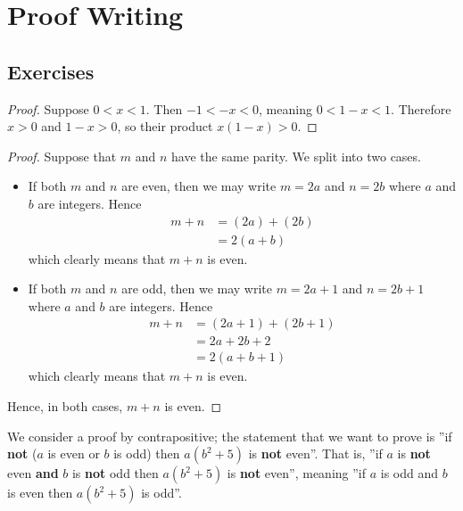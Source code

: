 \section{Proof Writing}
\subsection*{Exercises}
\begin{questions}
    \item \begin{proof}
        Suppose $0 < x < 1$. Then $-1 < -x < 0$, meaning $0 < 1 - x < 1$. Therefore $x > 0$ and $1-x > 0$, so their product $x(1-x) > 0$.
    \end{proof}

    \item \begin{proof}
        Suppose that $m$ and $n$ have the same parity. We split into two cases.
        \begin{itemize}
            \item If both $m$ and $n$ are even, then we may write $m = 2a$ and $n = 2b$ where $a$ and $b$ are integers. Hence
            \begin{align*}
                m + n &= (2a) + (2b) \\
                &= 2(a+b)
            \end{align*}
            which clearly means that $m + n$ is even.
            \item If both $m$ and $n$ are odd, then we may write $m = 2a + 1$ and $n = 2b + 1$ where $a$ and $b$ are integers. Hence
            \begin{align*}
                m + n &= (2a + 1) + (2b + 1)\\
                &= 2a + 2b + 2\\
                &= 2(a + b + 1)
            \end{align*}
            which clearly means that $m+n$ is even.
        \end{itemize}
    Hence, in both cases, $m + n$ is even.
    \end{proof}

    \item We consider a proof by contrapositive; the statement that we want to prove is ''if \textbf{not} ($a$ is even or $b$ is odd) then $a(b^2+5)$ is \textbf{not} even''. That is, ''if $a$ is \textbf{not} even \textbf{and} $b$ is \textbf{not} odd then $a(b^2+5)$ is \textbf{not} even'', meaning ''if $a$ is odd and $b$ is even then $a(b^2+5)$ is odd''.


\end{questions}
